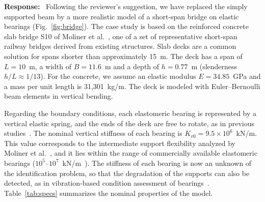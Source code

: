\documentclass[11pt]{article}
\newenvironment{response}{\par\smallskip\noindent\color{resp}\textbf{Response:}\ }{\par}
\begin{document}
\begin{response}
Following the reviewer's suggestion, we have replaced the simply supported beam by a more realistic model of a short-span bridge on elastic bearings (Fig.~\ref{fig:bridge}).
The case study is based on the reinforced concrete slab bridge S10 of Moliner et al.~\cite{moliner2017dynamic}, one of a set of representative short-span railway bridges derived from existing structures.
Slab decks are a common solution for spans shorter than approximately 15~m.
The deck has a span of $L=10$~m, a width of $B=11.6$~m and a depth of $h=0.77$~m (slenderness $h/L\approx1/13$).
For the concrete, we assume an elastic modulus $E=34.85$~GPa and a mass per unit length is 31,301~kg/m.
The deck is modeled with Euler--Bernoulli beam elements in vertical bending.

Regarding the boundary conditions, each elastomeric bearing is represented by a vertical elastic spring, and the ends of the deck are free to rotate, as in previous studies~\cite{elborgi2005modal,moliner2017dynamic,erduran2022effect}.
The nominal vertical stiffness of each bearing is $K_{v0}=9.5\times10^{6}$~kN/m.
This value corresponds to the intermediate support flexibility analyzed by Moliner et al.~\cite{moliner2017dynamic}, and it lies within the range of commercially available elastomeric bearings ($10^{5}$--$10^{7}$~kN/m~\cite{erduran2022effect}).
The stiffness of each bearing is now an unknown of the identification problem, so that the degradation of the supports can also be detected, as in vibration-based condition assessment of bearings~\cite{fayyadh2012condition}.
Table~\ref{tab:specs} summarizes the nominal properties of the model.
\end{response}
\end{document}
